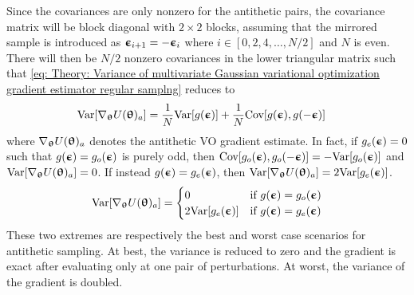 Since the covariances are only nonzero for the antithetic pairs, the covariance matrix will be block diagonal with $2\times2$ blocks, assuming that the mirrored sample is introduced as ${\boldsymbol{\upepsilon}}_{i+1} = -{\boldsymbol{\upepsilon}}_i$ where $i\in[0,2,4,\dots,N/2]$ and $N$ is even. There will then be $N/2$ nonzero covariances in the lower triangular matrix such that \eqref{eq: Theory: Variance of multivariate Gaussian variational optimization gradient estimator regular samplng} reduces to
\begin{align}
    \text{Var}{\left[\nabla_{\boldsymbol{\uptheta}}U({\boldsymbol{\uptheta}})_a\right]}
    &= \frac{1}{N}\text{Var}{\left[g({\boldsymbol{\upepsilon}})\right]} + \frac{1}{N}\text{Cov}{\left[g({\boldsymbol{\upepsilon}}), g(-{\boldsymbol{\upepsilon}})\right]}
\end{align}
where $\nabla_{\boldsymbol{\uptheta}} U({\boldsymbol{\uptheta}})_a$ denotes the antithetic \gls{VO} gradient estimate.
In fact, if $g_e({\boldsymbol{\upepsilon}})=0$ such that $g({\boldsymbol{\upepsilon}})=g_o({\boldsymbol{\upepsilon}})$ is purely odd, then $\text{Cov}{\left[g_o({\boldsymbol{\upepsilon}}),g_o(-{\boldsymbol{\upepsilon}})\right]} = - \text{Var}{\left[g_o({\boldsymbol{\upepsilon}})\right]}$ and $\text{Var}{\left[\nabla_{\boldsymbol{\uptheta}}U({\boldsymbol{\uptheta}})_a\right]}=0$. 
If instead $g({\boldsymbol{\upepsilon}})=g_e({\boldsymbol{\upepsilon}})$, then $\text{Var}{\left[\nabla_{\boldsymbol{\uptheta}}U({\boldsymbol{\uptheta}})_a\right]}=2\text{Var}{\left[g_e({\boldsymbol{\upepsilon}})\right]}$. 
\begin{equation}
    \text{Var}{\left[\nabla_{\boldsymbol{\uptheta}}U({\boldsymbol{\uptheta}})_a\right]} = 
    \begin{cases}
        0 & \text{if } g({\boldsymbol{\upepsilon}})=g_o({\boldsymbol{\upepsilon}})\\
        2\text{Var}{\left[g_e({\boldsymbol{\upepsilon}})\right]} & \text{if } g({\boldsymbol{\upepsilon}})=g_e({\boldsymbol{\upepsilon}})
    \end{cases}\label{eq: Theory: Antithetic sampling best and worst cases}
\end{equation}
These two extremes are respectively the best and worst case scenarios for antithetic sampling. At best, the variance is reduced to zero and the gradient is exact after evaluating only at one pair of perturbations. At worst, the variance of the gradient is doubled.


